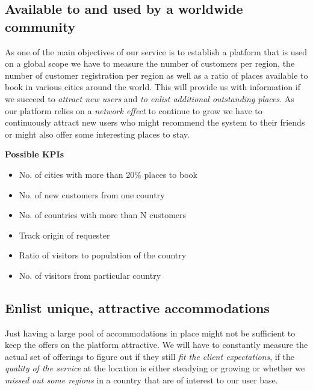
\subsection{Available to and used by a worldwide community}
As one of the main objectives of our service is to establish a platform that is used on a global scope we have to measure the number of customers per region, the number of customer registration per region as well as a ratio of places available to book in various cities around the world. This will provide us with information if we succeed to \textit{attract new users} and \textit{to enlist additional outstanding places}. As our platform relies on a \textit{network effect} to continue to grow we have to continuously attract new users who might recommend the system to their friends or might also offer some interesting places to stay. 

\begin{description}
	\item \textbf{Possible KPIs}
	\begin{itemize}
    	\item No. of cities with more than 20\% places to book
        \item No. of new customers from one country
        \item No. of countries with more than N customers
        \item Track origin of requester
        \item Ratio of visitors to population of the country
        \item No. of visitors from particular country
    \end{itemize}
\end{description}


\subsection{Enlist unique, attractive accommodations}
Just having a large pool of accommodations in place might not be sufficient to keep the offers on the platform attractive. We will have to constantly measure the actual set of offerings to figure out if they still \textit{fit the client expectations}, if the \textit{quality of the service} at the location is either steadying or growing or whether we \textit{missed out some regions} in a country that are of interest to our user base.

